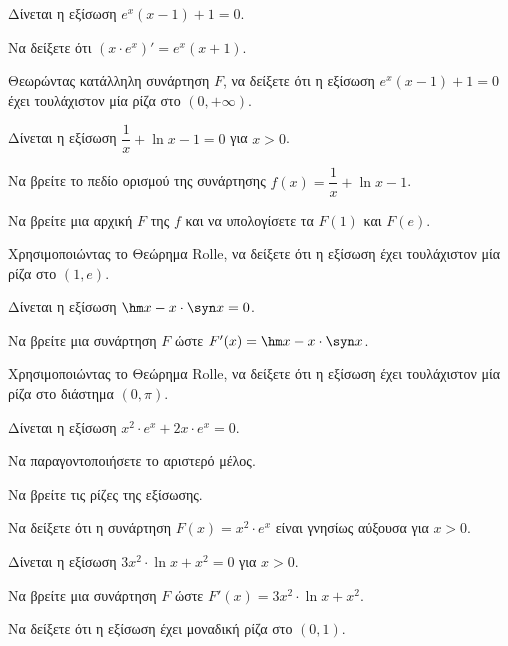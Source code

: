 \documentclass[11pt,a4paper,modern]{FFExercises}
\begin{document}
\askhsh
Δίνεται η εξίσωση $e^x(x - 1) + 1 = 0$.
\begin{alist}
  \item Να δείξετε ότι $(x \cdot e^x)' = e^x(x+1)$.
  \item Θεωρώντας κατάλληλη συνάρτηση $F$, να δείξετε ότι η εξίσωση $e^x(x - 1) + 1 = 0$ έχει τουλάχιστον μία ρίζα στο $(0, +\infty)$.
\end{alist}

\askhsh
Δίνεται η εξίσωση $\dfrac{1}{x} + \ln x - 1 = 0$ για $x > 0$.
\begin{alist}
  \item Να βρείτε το πεδίο ορισμού της συνάρτησης $f(x) = \dfrac{1}{x} + \ln x - 1$.
  \item Να βρείτε μια αρχική $F$ της $f$ και να υπολογίσετε τα $F(1)$ και $F(e)$.
  \item Χρησιμοποιώντας το Θεώρημα Rolle, να δείξετε ότι η εξίσωση έχει τουλάχιστον μία ρίζα στο $(1, e)$.
\end{alist}

\askhsh
Δίνεται η εξίσωση $\hm x - x \cdot \syn x = 0$.
\begin{alist}
  \item Να βρείτε μια συνάρτηση $F$ ώστε $F'(x) = \hm x - x \cdot \syn x$.
  \item Χρησιμοποιώντας το Θεώρημα Rolle, να δείξετε ότι η εξίσωση έχει τουλάχιστον μία ρίζα στο διάστημα $(0, \pi)$.
\end{alist}

\askhsh
Δίνεται η εξίσωση $x^2 \cdot e^x + 2x \cdot e^x = 0$.
\begin{alist}
  \item Να παραγοντοποιήσετε το αριστερό μέλος.
  \item Να βρείτε τις ρίζες της εξίσωσης.
  \item Να δείξετε ότι η συνάρτηση $F(x) = x^2 \cdot e^x$ είναι γνησίως αύξουσα για $x > 0$.
\end{alist}

\askhsh
Δίνεται η εξίσωση $3x^2 \cdot \ln x + x^2 = 0$ για $x > 0$.
\begin{alist}
  \item Να βρείτε μια συνάρτηση $F$ ώστε $F'(x) = 3x^2 \cdot \ln x + x^2$.
  \item Να δείξετε ότι η εξίσωση έχει μοναδική ρίζα στο $(0, 1)$.
\end{alist}

\end{document}
